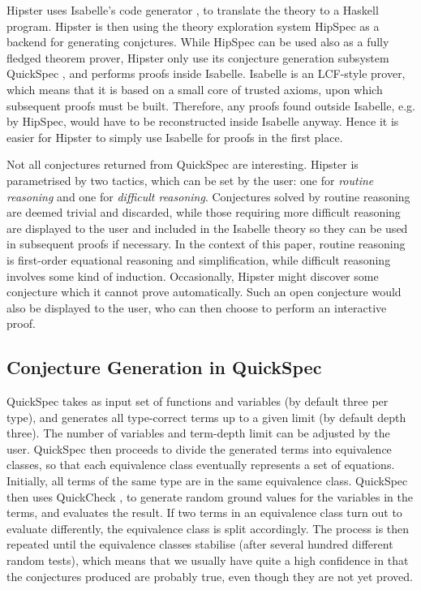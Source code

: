 Hipster uses Isabelle's code generator \cite{codegen2}, to translate the theory to a Haskell program. Hipster is then using the theory exploration system HipSpec as a backend for generating conjctures. While HipSpec can be used also as a fully fledged theorem prover, Hipster only use its conjecture generation subsystem QuickSpec \cite{quickspec}, and performs proofs inside Isabelle. Isabelle is an LCF-style prover, which means that it is based on a small core of trusted axioms, upon which subsequent proofs must be built. Therefore, any proofs found outside Isabelle, e.g. by HipSpec, would have to be reconstructed inside Isabelle anyway. Hence it is easier for Hipster to simply use Isabelle for proofs in the first place. 

Not all conjectures returned from QuickSpec are interesting. Hipster is parametrised by two tactics, which can be set by the user: one for \emph{routine reasoning} and one for \emph{difficult reasoning}. Conjectures solved by routine reasoning are deemed trivial and discarded, while those requiring more difficult reasoning are displayed to the user and included in the Isabelle theory so they can be used in subsequent proofs if necessary. In the context of this paper, routine reasoning is first-order equational reasoning and simplification, while difficult reasoning involves some kind of induction. Occasionally, Hipster might discover some conjecture which it cannot prove automatically. Such an open conjecture would also be displayed to the user, who can then choose to perform an interactive proof.

\subsection{Conjecture Generation in QuickSpec}
QuickSpec takes as input set of functions and variables (by default three per type), and generates all type-correct terms up to a given limit (by default depth three). The number of variables and term-depth limit can be adjusted by the user. QuickSpec then proceeds to divide the generated terms into equivalence classes, so that each equivalence class eventually represents a set of equations. Initially, all terms of the same type are in the same equivalence class. QuickSpec then uses QuickCheck \cite{quickcheck}, to generate random ground values for the variables in the terms, and evaluates the result. If two terms in an equivalence class turn out to evaluate differently, the equivalence class is split accordingly. The process is then repeated until the equivalence classes stabilise (after several hundred different random tests), which means that we usually have quite a high confidence in that the conjectures produced are probably true, even though they are not yet proved.  

